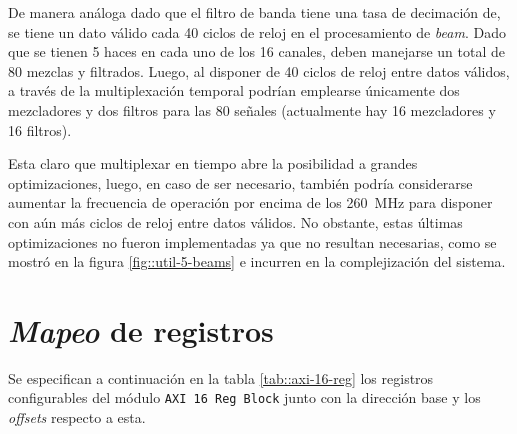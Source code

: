 \documentclass[../../main.tex]{subfiles}
\begin{document}
De manera análoga dado que el filtro de banda tiene una tasa de decimación de, se tiene un dato válido cada 40 ciclos de reloj en el procesamiento de \textit{beam}. Dado que se tienen 5 haces en cada uno de los 16 canales, deben manejarse un total de 80 mezclas y filtrados. Luego, al disponer de 40 ciclos de reloj entre datos válidos, a través de la multiplexación temporal podrían emplearse únicamente dos mezcladores y dos filtros para las 80 señales (actualmente hay 16 mezcladores y 16 filtros).

Esta claro que multiplexar en tiempo abre la posibilidad a grandes optimizaciones, luego, en caso de ser necesario, también podría considerarse aumentar la frecuencia de operación por encima de los 260~MHz para disponer con aún más ciclos de reloj entre datos válidos. No obstante, estas últimas optimizaciones no fueron implementadas ya que no resultan necesarias, como se mostró en la figura \ref{fig::util-5-beams} e incurren en la complejización del sistema.



\section{\textit{Mapeo} de registros}
Se especifican a continuación en la tabla \ref{tab::axi-16-reg} los registros configurables del módulo \texttt{AXI 16 Reg Block} junto con la dirección base y los \textit{offsets} respecto a esta.
\end{document}
